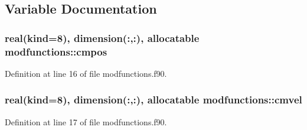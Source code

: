 \subsection{Variable Documentation}
\subsubsection[{\texorpdfstring{cmpos}{cmpos}}]{\setlength{\rightskip}{0pt plus 5cm}real(kind=8), dimension(\+:,\+:), allocatable modfunctions\+::cmpos}\hypertarget{namespacemodfunctions_a71740bc327f63502e10951f11e4eff8d}{}\label{namespacemodfunctions_a71740bc327f63502e10951f11e4eff8d}


Definition at line 16 of file modfunctions.\+f90.

\subsubsection[{\texorpdfstring{cmvel}{cmvel}}]{\setlength{\rightskip}{0pt plus 5cm}real(kind=8), dimension(\+:,\+:), allocatable modfunctions\+::cmvel}\hypertarget{namespacemodfunctions_a277e0476f0b8e3abcf80fdf935b0fa41}{}\label{namespacemodfunctions_a277e0476f0b8e3abcf80fdf935b0fa41}


Definition at line 17 of file modfunctions.\+f90.

